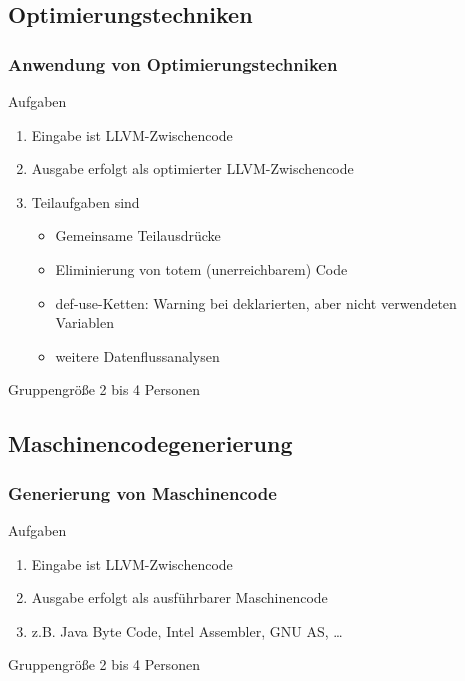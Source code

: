 \documentclass[ucs,9pt]{beamer}
\begin{document}
\subsection{Optimierungstechniken}
\begin{frame}
  \frametitle{Anwendung von Optimierungstechniken}

  \begin{block}{Aufgaben}
    \begin{enumerate}
        \item Eingabe ist LLVM-Zwischencode
        \item Ausgabe erfolgt als optimierter LLVM-Zwischencode
        \item Teilaufgaben sind
          \begin{itemize}
            \item Gemeinsame Teilausdrücke
            \item Eliminierung von totem (unerreichbarem) Code
            \item def-use-Ketten: Warning bei deklarierten, aber nicht verwendeten Variablen
            \item weitere Datenflussanalysen 
          \end{itemize}
    \end{enumerate}
  \end{block}

  \begin{block}{Gruppengröße}
    2 bis 4 Personen
  \end{block}
\end{frame}

\subsection{Maschinencodegenerierung}
\begin{frame}
  \frametitle{Generierung von Maschinencode}

  \begin{block}{Aufgaben}
    \begin{enumerate}
      \item Eingabe ist LLVM-Zwischencode
      \item Ausgabe erfolgt als ausführbarer Maschinencode
      \item z.B. Java Byte Code, Intel Assembler, GNU AS, \ldots 
    \end{enumerate}
  \end{block}

  \begin{block}{Gruppengröße}
    2 bis 4 Personen
  \end{block}
\end{frame}
\end{document}

